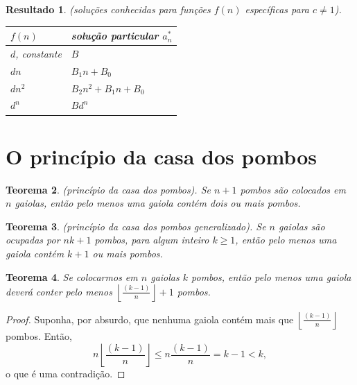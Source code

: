 \documentclass{article}
\theoremstyle{plain}
\newtheorem{thm}{Teorema}[section]
\newtheorem{res}[thm]{Resultado}
\theoremstyle{definition}
\theoremstyle{remark}
\begin{document}
\begin{res} (soluções conhecidas para funções \(f(n)\) específicas para \(c\neq 1\)). \vspace{2mm}\newline
    \begin{tabular}[c]{ll}
        \(f(n)\) & \textup{solução particular} \(a^{*}_{n}\) \\
        \hline
        \(d\)\textup{, constante} & \(B\) \\
        \(dn\) & \(B_1n + B_0\) \\
        \(dn^2\) & \(B_2 n^2 + B_1 n + B_0\) \\
        \(d^n\) & \(B d^n\) \\
    \end{tabular}
\end{res}

\section{O princípio da casa dos pombos}

\begin{thm} (princípio da casa dos pombos).
    Se \(n+1\) pombos são colocados em \(n\) gaiolas, então pelo menos uma gaiola contém dois ou mais pombos.
\end{thm}

\begin{thm} (princípio da casa dos pombos generalizado).
    Se \(n\) gaiolas são ocupadas por \(nk+1\) pombos, para algum inteiro \(k \geq 1\), então pelo menos uma gaiola contém \(k+1\) ou mais pombos.
\end{thm}

\begin{thm}\label{eq:pcp}
    Se colocarmos em \(n\) gaiolas \(k\) pombos, então pelo menos uma gaiola deverá conter pelo menos \(\displaystyle \left \lfloor \frac{(k-1)}{n} \right \rfloor + 1\) pombos.
\end{thm}

\begin{proof}
    Suponha, por absurdo, que nenhuma gaiola contém mais que \(\displaystyle \left \lfloor \frac{(k-1)}{n} \right \rfloor\) pombos. Então,
    \begin{equation*}
        n \left \lfloor \frac{(k-1)}{n} \right \rfloor \leq n \frac{(k-1)}{n} = k-1 < k,
    \end{equation*}
    \noindent o que é uma contradição.
\end{proof}
\end{document}
